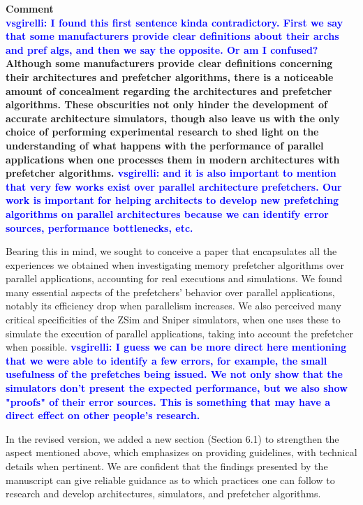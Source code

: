\documentclass{article}
\newcounter{answer}
\newenvironment{answer}
{ \refstepcounter{answer}\vspace{0.5cm}\bfseries\noindent Comment~\theanswer\\ }
{ \vspace{0.5cm} }
\newcommand{\vsg}[1]{\textcolor{blue}{\textbf{vsgirelli: #1} }\vspace{0.2cm}}
\begin{document}
\begin{answer}
\vsg{I found this first sentence kinda contradictory. First we say that some manufacturers provide clear definitions about their archs and pref algs, and then we say the opposite. Or am I confused?}
Although some manufacturers provide clear definitions concerning their architectures and prefetcher algorithms, there is a noticeable amount of concealment regarding the architectures and prefetcher algorithms. These obscurities not only hinder the development of accurate architecture simulators, though also leave us with the only choice of performing experimental research to shed light on the understanding of what happens with the performance of parallel applications when one processes them in modern architectures with prefetcher algorithms.
\vsg{and it is also important to mention that very few works exist over parallel architecture prefetchers. Our work is important for helping architects to develop new prefetching algorithms on parallel architectures because we can identify error sources, performance bottlenecks, etc.}

Bearing this in mind, we sought to conceive a paper that encapsulates all the experiences we obtained when investigating memory prefetcher algorithms over parallel applications, accounting for real executions and simulations. 
We found many essential aspects of the prefetchers' behavior over parallel applications, notably its efficiency drop when parallelism increases. We also perceived many critical specificities of the ZSim and Sniper simulators, when one uses these to simulate the execution of parallel applications, taking into account the prefetcher when possible. 
\vsg{I guess we can be more direct here mentioning that we were able to identify a few errors, for example, the small usefulness of the prefetches being issued. We not only show that the simulators don't present the expected performance, but we also show "proofs" of their error sources. This is something that may have a direct effect on other people's research.}

In the revised version, we added a new section (Section 6.1) to strengthen the aspect mentioned above, which emphasizes on providing guidelines, with technical details when pertinent. We are confident that the findings presented by the manuscript can give reliable guidance as to which practices one can follow to research and develop architectures, simulators, and prefetcher algorithms. 





\end{answer}
\end{document}
